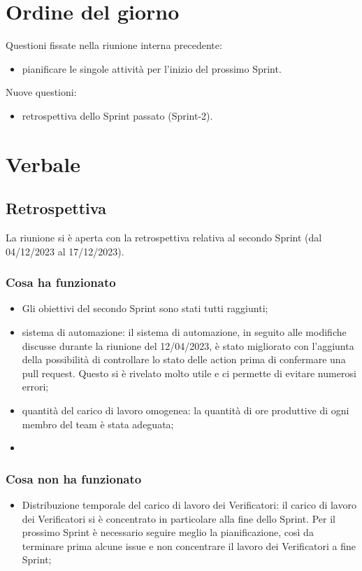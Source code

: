 \documentclass[12pt]{article}
\begin{document}
    \section{Ordine del giorno}
        Questioni fissate nella riunione interna precedente:
        \begin{itemize}
			\item pianificare le singole attività per l'inizio del prossimo Sprint.
    	\end{itemize}
    	Nuove questioni:
    	\begin{itemize}
    		\item retrospettiva dello Sprint passato (Sprint-2).
    	\end{itemize}
    
    \section{Verbale}

	\subsection{Retrospettiva}

	La riunione si è aperta con la retrospettiva relativa al secondo Sprint (dal 04/12/2023 al 17/12/2023).

	\subsubsection{Cosa ha funzionato}
	\begin{itemize}
		\item Gli obiettivi del secondo Sprint sono stati tutti raggiunti;
		\item sistema di automazione: il sistema di automazione, in seguito alle modifiche discusse durante la riunione del 12/04/2023, è stato migliorato con l'aggiunta della possibilità di controllare lo stato delle action prima di confermare una pull request. Questo si è rivelato molto utile e ci permette di evitare numerosi errori;
		\item quantità del carico di lavoro omogenea: la quantità di ore produttive di ogni membro del team è stata adeguata;
		\item 
	\end{itemize}
	
	\subsubsection{Cosa non ha funzionato}
	\begin{itemize}
		\item Distribuzione temporale del carico di lavoro dei Verificatori: il carico di lavoro dei Verificatori si è concentrato in particolare alla fine dello Sprint. Per il prossimo Sprint è necessario seguire meglio la pianificazione, così da terminare prima alcune issue e non concentrare il lavoro dei Verificatori a fine Sprint;
	\end{itemize}
\end{document}
